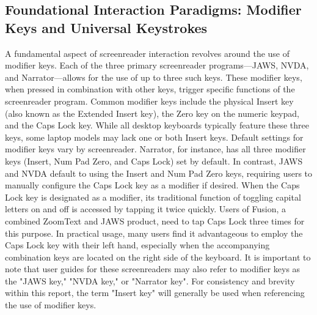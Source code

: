 \subsection{Foundational Interaction Paradigms: Modifier Keys and Universal Keystrokes}
A fundamental aspect of screenreader interaction revolves around the use of modifier keys. Each of the three primary screenreader programs—JAWS, NVDA, and Narrator—allows for the use of up to three such keys. These modifier keys, when pressed in combination with other keys, trigger specific functions of the screenreader program. Common modifier keys include the physical Insert key (also known as the Extended Insert key), the Zero key on the numeric keypad, and the Caps Lock key.\supercite{kingsbury2025} While all desktop keyboards typically feature these three keys, some laptop models may lack one or both Insert keys.\supercite{kingsbury2025}
Default settings for modifier keys vary by screenreader. Narrator, for instance, has all three modifier keys (Insert, Num Pad Zero, and Caps Lock) set by default. In contrast, JAWS and NVDA default to using the Insert and Num Pad Zero keys, requiring users to manually configure the Caps Lock key as a modifier if desired.\supercite{kingsbury2025} When the Caps Lock key is designated as a modifier, its traditional function of toggling capital letters on and off is accessed by tapping it twice quickly. Users of Fusion, a combined ZoomText and JAWS product, need to tap Caps Lock three times for this purpose.\supercite{kingsbury2025} In practical usage, many users find it advantageous to employ the Caps Lock key with their left hand, especially when the accompanying combination keys are located on the right side of the keyboard.\supercite{kingsbury2025} It is important to note that user guides for these screenreaders may also refer to modifier keys as the "JAWS key," "NVDA key," or "Narrator key".\supercite{kingsbury2025} For consistency and brevity within this report, the term "Insert key" will generally be used when referencing the use of modifier keys.\supercite{kingsbury2025}
